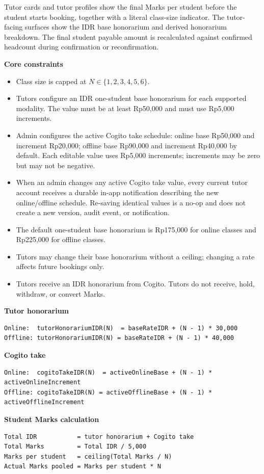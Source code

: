 \documentclass[11pt,a4paper]{article}
\begin{document}
Tutor cards and tutor profiles show the final Marks per student before the student starts booking, together with a literal class-size indicator. The tutor-facing surfaces show the IDR base honorarium and derived honorarium breakdown. The final student payable amount is recalculated against confirmed headcount during confirmation or reconfirmation.

\textbf{Core constraints}
\begin{itemize}
    \item Class size is capped at $N \in \{1,2,3,4,5,6\}$.
    \item Tutors configure an IDR one-student base honorarium for each supported modality. The value must be at least Rp50,000 and must use Rp5,000 increments.
    \item Admin configures the active Cogito take schedule: online base Rp50,000 and increment Rp20,000; offline base Rp90,000 and increment Rp40,000 by default. Each editable value uses Rp5,000 increments; increments may be zero but may not be negative.
    \item When an admin changes any active Cogito take value, every current tutor account receives a durable in-app notification describing the new online/offline schedule. Re-saving identical values is a no-op and does not create a new version, audit event, or notification.
    \item The default one-student base honorarium is Rp175,000 for online classes and Rp225,000 for offline classes.
    \item Tutors may change their base honorarium without a ceiling; changing a rate affects future bookings only.
    \item Tutors receive an IDR honorarium from Cogito. Tutors do not receive, hold, withdraw, or convert Marks.
\end{itemize}

\textbf{Tutor honorarium}
\begin{verbatim}
Online:  tutorHonorariumIDR(N)  = baseRateIDR + (N - 1) * 30,000
Offline: tutorHonorariumIDR(N) = baseRateIDR + (N - 1) * 40,000
\end{verbatim}

\textbf{Cogito take}
\begin{verbatim}
Online:  cogitoTakeIDR(N)  = activeOnlineBase + (N - 1) * activeOnlineIncrement
Offline: cogitoTakeIDR(N) = activeOfflineBase + (N - 1) * activeOfflineIncrement
\end{verbatim}

\textbf{Student Marks calculation}
\begin{verbatim}
Total IDR           = tutor honorarium + Cogito take
Total Marks         = Total IDR / 5,000
Marks per student   = ceiling(Total Marks / N)
Actual Marks pooled = Marks per student * N
\end{verbatim}
\end{document}
